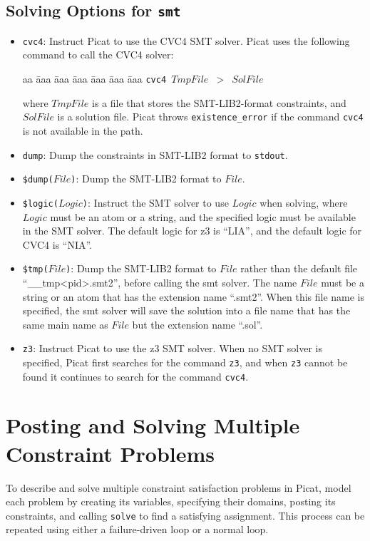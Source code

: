 \subsection{Solving Options for \texttt{smt}}
\begin{itemize}
\item \texttt{cvc4}: Instruct Picat to use the CVC4 SMT solver. Picat uses the following command to call the CVC4 solver:
\begin{tabbing}
aa \= aaa \= aaa \= aaa \= aaa \= aaa \= aaa \kill
\> \texttt{cvc4 $TmpFile$ $>$ $SolFile$ }
\end{tabbing}
where $TmpFile$ is a file that stores the SMT-LIB2-format constraints, and $SolFile$ is a solution file. Picat throws \texttt{existence\_error} if the command \texttt{cvc4} is not available in the path.
\item \texttt{dump}: Dump the constraints in SMT-LIB2 format to \texttt{stdout}.
\item \texttt{\$dump($File$)}: Dump the SMT-LIB2 format to $File$.
\item \texttt{\$logic($Logic$)}: Instruct the SMT solver to use $Logic$ when solving, where $Logic$ must be an atom or a string, and the specified logic must be available in the SMT solver. The default logic for z3 is ``LIA'', and the default logic for CVC4 is ``NIA''.
\item \texttt{\$tmp($File$)}: Dump the SMT-LIB2 format to $File$ rather than the default file ``\_\_tmp<pid>.smt2'', before calling the smt solver. The name $File$  must be a string or an atom that has the extension name ``.smt2''. When this file name is specified, the smt solver will save the solution into a file name that has the same main name as $File$ but the extension name ``.sol''.
\item \texttt{z3}: Instruct Picat to use the z3 SMT solver. When no SMT solver is specified, Picat first searches for the command \texttt{z3}, and when \texttt{z3} cannot be found it continues to search for the command \texttt{cvc4}.
\end{itemize}
\ignore{

}

\section{Posting and Solving Multiple Constraint Problems}
To describe and solve multiple constraint satisfaction problems in Picat, model each problem by creating its variables, specifying their domains, posting its constraints, and calling \texttt{solve} to find a satisfying assignment. This process can be repeated using either a failure-driven loop or a normal loop. 

